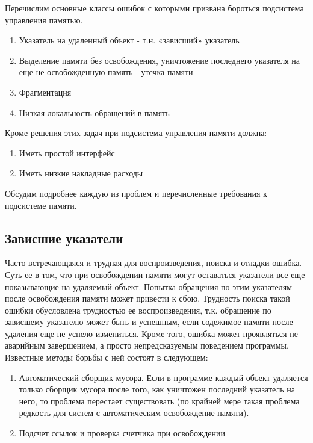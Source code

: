\documentclass{article}
\begin{document}
Перечислим основные классы ошибок с которыми призвана бороться подсистема управления памятью.
\begin{enumerate}
\item  Указатель на удаленный объект -  т.н. «зависший» указатель

\item  Выделение памяти без освобождения, уничтожение последнего указателя на еще не освобожденную память  - утечка памяти 

\item  Фрагментация

\item  Низкая локальность обращений в память
\end{enumerate}
Кроме решения этих задач при подсистема управления памяти должна:

\begin{enumerate}
\item  Иметь простой интерфейс 

\item  Иметь низкие накладные расходы
\end{enumerate}

Обсудим подробнее каждую из проблем и перечисленные требования к подсистеме памяти.

\subsection{Зависшие  указатели}
Часто встречающаяся и трудная для воспроизведения, поиска и отладки ошибка. Суть ее в том, что при освобождении памяти могут оставаться указатели все еще показывающие на удаляемый объект. Попытка обращения по этим указателям после освобождения памяти может привести к сбою. Трудность поиска такой ошибки обусловлена трудностью ее воспроизведения, т.к. обращение по зависшему указателю может быть и успешным, если содежимое памяти после удаления еще не успело измениться. Кроме того, ошибка может проявляться не аварийным завершением, а просто непредсказуемым поведением программы.  Известные методы борьбы с ней состоят в следующем:

\begin{enumerate}
\item  Автоматический сборщик мусора. Если в программе каждый объект удаляется только сборщик мусора после того, как уничтожен последний указатель на него, то проблема перестает существовать (по крайней мере такая проблема редкость для систем с автоматическим освобождение памяти).

\item  Подсчет ссылок и проверка счетчика при освобождении
\end{enumerate}
\end{document}
